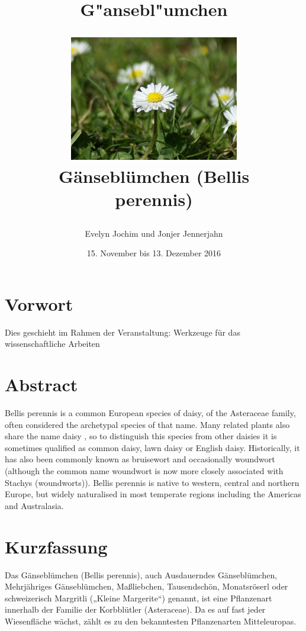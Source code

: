 \documentclass[11pt]{article}
\title{G"ansebl"umchen\\
	\begin{figure}[H]
	    \centering
        \includegraphics[width=0.66\textwidth]{1.jpg}
    	\caption{Gänseblümchen (Bellis perennis)}
	    \label{fig1}
    \end{figure}
    }
\author{Evelyn Jochim und Jonjer Jennerjahn }
\date{15. November bis 13. Dezember 2016}
\begin{document}
  
    \maketitle 
    \thispagestyle{empty}
    \newpage
	\tableofcontents
	\thispagestyle{empty}
	\newpage
	
	\section*{Vorwort}
	Dies geschieht im Rahmen der Veranstaltung: Werkzeuge für das wissenschaftliche Arbeiten
	
	\section{Abstract}
	Bellis perennis is a common European species of daisy, of the Asteraceae family, often considered the archetypal species of that name.
    Many related plants also share the name daisy , so to distinguish this species from other daisies it is sometimes qualified as common daisy, lawn daisy or English daisy. Historically, it has also been commonly known as bruisewort and occasionally woundwort (although the common name woundwort is now more closely associated with Stachys (woundworts)). Bellis perennis is native to western, central and northern Europe, but widely naturalised in most temperate regions including the Americas\cite{2}\cite{3} and Australasia.



	\section{Kurzfassung}
	Das Gänseblümchen (Bellis perennis), auch Ausdauerndes Gänseblümchen,\cite{1} Mehrjähriges Gänseblümchen, Maßliebchen, Tausendschön, Monatsröserl oder schweizerisch Margritli („Kleine Margerite“) genannt,\cite{2} ist eine Pflanzenart innerhalb der Familie der Korbblütler (Asteraceae). Da es auf fast jeder Wiesenfläche wächst, zählt es zu den bekanntesten Pflanzenarten Mitteleuropas.
	
\end{document}
